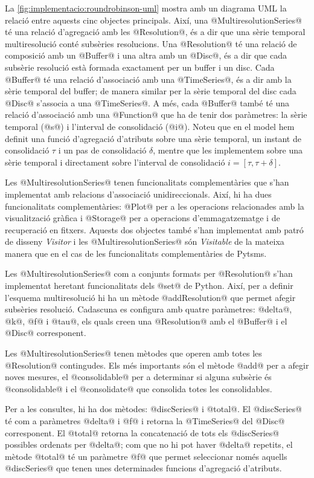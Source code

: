 La \autoref{fig:implementacio:roundrobinson-uml} mostra amb un
diagrama \gls{UML} la relació entre aquests cinc objectes
principals. Així, una @MultiresolutionSeries@ té una relació
d'agregació amb les @Resolution@, és a dir que una sèrie temporal
multiresolució conté subsèries resolucions.  Una @Resolution@ té una
relació de composició amb un @Buffer@ i una altra amb un @Disc@, és a
dir que cada subsèrie resolució està formada exactament per un buffer
i un disc. Cada @Buffer@ té una relació d'associació amb una
@TimeSeries@, és a dir amb la sèrie temporal del buffer; de manera
similar per la sèrie temporal del disc cada @Disc@ s'associa a una
@TimeSeries@. A més, cada @Buffer@ també té una relació d'associació
amb una @Function@ que ha de tenir dos paràmetres: la sèrie temporal
(@s@) i l'interval de consolidació (@i@). Noteu que en el model hem
definit una funció d'agregació d'atributs sobre una sèrie temporal, un
instant de consolidació $\tau$ i un pas de consolidació $\delta$,
mentre que les implementem sobre una sèrie temporal i directament
sobre l'interval de consolidació $i=[\tau,\tau+\delta]$.





Les @MultiresolutionSeries@ tenen funcionalitats complementàries
que s'han implementat amb relacions d'associació
unidireccionals. Així, hi ha dues funcionalitats complementàries:
@Plot@ per a les operacions relacionades amb la visualització
gràfica i @Storage@ per a operacions d'emmagatzematge i de
recuperació en fitxers. Aquests dos objectes també s'han implementat
amb patró de disseny \emph{Visitor} i les @MultiresolutionSeries@
són \emph{Visitable} de la mateixa manera que en el cas de les
funcionalitats complementàries de Pytsms.


Les @MultiresolutionSeries@ com a conjunts formats per
@Resolution@ s'han implementat heretant funcionalitats dels
@set@ de Python. Així, per a definir l'esquema multiresolució hi
ha un mètode @addResolution@ que permet afegir subsèries
resolució. Cadascuna es configura amb quatre paràmetres: @delta@,
@k@, @f@ i @tau@, els quals creen una @Resolution@
amb el @Buffer@ i el @Disc@ corresponent.

Les @MultiresolutionSeries@ tenen mètodes que operen amb totes les
@Resolution@ contingudes. Els més importants són el mètode @add@ per a
afegir noves mesures, el @consolidable@ per a determinar si alguna
subsèrie és @consolidable@ i el @consolidate@ que consolida totes les
consolidables.

Per a les consultes, hi ha dos mètodes: @discSeries@ i @total@. El
@discSeries@ té com a paràmetres @delta@ i @f@ i retorna la
@TimeSeries@ del @Disc@ corresponent. El @total@ retorna la
concatenació de tots els @discSeries@ possibles ordenats per @delta@;
com que no hi pot haver @delta@ repetits, el mètode @total@ té un
paràmetre @f@ que permet seleccionar només aquells @discSeries@ que
tenen unes determinades funcions d'agregació d'atributs.



